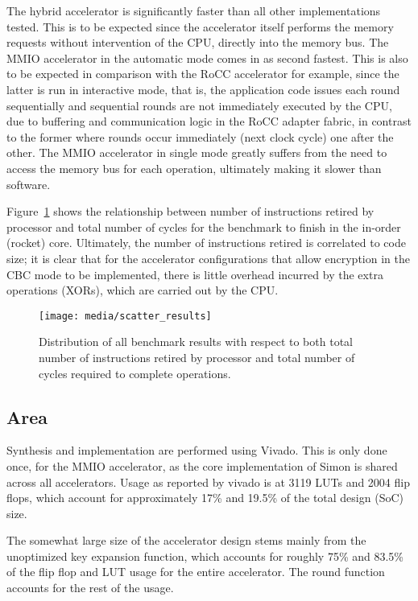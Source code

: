 \documentclass[10pt,conference]{IEEEtran}
\begin{document}
The hybrid accelerator is significantly faster than all other implementations
tested. This is to be expected since the accelerator itself performs the memory
requests without intervention of the CPU, directly into the memory bus. The
MMIO accelerator in the automatic mode comes in as second fastest. This
is also to be expected in comparison with the RoCC accelerator for example,
since the latter is run in interactive mode, that is, the application code
issues each round sequentially and sequential rounds are not immediately
executed by the CPU, due to buffering and communication logic in the RoCC
adapter fabric, in contrast to the former where rounds occur immediately (next
clock cycle) one after the other. The MMIO accelerator in single mode greatly
suffers from the need to access the memory bus for each operation, ultimately
making it slower than software.


Figure~\ref{fig:scatter} shows the relationship between number of instructions
retired by processor and total number of cycles for the benchmark to finish in
the in-order (rocket) core. Ultimately, the number of instructions retired is
correlated to code size; it is clear that for the accelerator configurations
that allow encryption in the CBC mode to be implemented, there is little
overhead incurred by the extra operations (XORs), which are carried out by
the CPU.


\begin{figure}
  \centering
  \texttt{[image: media/scatter\_results]}
  \caption{Distribution of all benchmark results with respect to both total
    number of instructions retired by processor and total number of cycles
    required to complete operations.}
  \label{fig:scatter}
\end{figure}

\subsection{Area}

Synthesis and implementation are performed using Vivado. This is only done
once, for the MMIO accelerator, as the core implementation of Simon is shared
across all accelerators. Usage as reported by vivado is at 3119 LUTs and 2004
flip flops, which account for approximately 17\% and 19.5\% of the total design
(SoC) size.

The somewhat large size of the accelerator design stems mainly from the
unoptimized key expansion function, which accounts for roughly 75\% and 83.5\%
of the flip flop and LUT usage for the entire accelerator. The round function
accounts for the rest of the usage.
\end{document}
